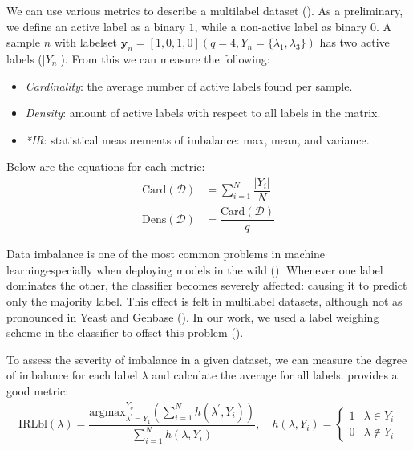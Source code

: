 \par We can use various metrics to describe a multilabel dataset
(\cite{charte2015imbalance}). As a preliminary, we define an active label as a binary
$1$, while a non-active label as binary $0$. A sample $n$ with labelset
$\mathbf{y}_n = \left[1,0,1,0\right] (q=4, Y_n = \{\lambda_1, \lambda_3\})$ has
two active labels ($|Y_n|$). From this we can measure the following:
\begin{itemize}
    \item \textit{Cardinality}: the average number of active labels found per
        sample.
    \item \textit{Density}: amount of active labels with respect to all
        labels in the matrix.
    \item \textit{*IR}: statistical measurements of imbalance: max, mean, and
        variance.
\end{itemize}

\par Below are the equations for each metric:
\begin{align}
    \text{Card}(\mathcal{D}) &= \sum_{i=1}^{N}
    \dfrac{|{Y}_{i}|}{N} \\
    \text{Dens}(\mathcal{D}) &=
    \dfrac{\text{Card}(\mathcal{D})}{q} 
\end{align}

\par Data imbalance is one of the most common problems in machine
learning\textemdash especially when deploying models in the wild
(\cite{he2009learning}). Whenever one label dominates the other, the classifier
becomes severely affected: causing it to predict only the majority label. This
effect is felt in multilabel datasets, although not as pronounced in Yeast and
Genbase (\cite{ charte2015imbalance}).  In our work, we used a label weighing
scheme in the classifier to offset this problem (\cite{pedregosa2011scikit,
chang2011libsvm}). 

\newpage
\par To assess the severity of imbalance in a given dataset, we can measure 
the degree of imbalance for each label $\lambda$ and calculate the average for
all labels. \cite{charte2015imbalance} provides a good metric:
\begin{align}
    \text{IRLbl}(\lambda) =
    \dfrac{
        \text{argmax}_{\lambda^{\prime}=Y_1}^{Y_q}
        (\sum_{i=1}^{N} h(\lambda^{\prime},Y_i))
    }{
        \sum_{i=1}^{N} h(\lambda,Y_i)
    }, \quad h(\lambda, Y_i) =
    \begin{cases}
        1 & \lambda \in Y_i \\
        0 & \lambda \notin Y_i
    \end{cases} 
\end{align}

